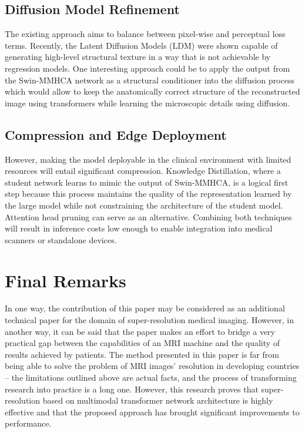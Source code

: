 \subsection{Diffusion Model Refinement}
The existing approach aims to balance between pixel-wise and perceptual loss terms. Recently, the Latent Diffusion Models (LDM) were shown capable of generating high-level structural texture in a way that is not achievable by regression models. One interesting approach could be to apply the output from the Swin-MMHCA network as a structural conditioner into the diffusion process which would allow to keep the anatomically correct structure of the reconstructed image using transformers while learning the microscopic details using diffusion.

\subsection{Compression and Edge Deployment}
However, making the model deployable in the clinical environment with limited resources will entail significant compression. Knowledge Distillation, where a student network learns to mimic the output of Swin-MMHCA, is a logical first step because this process maintains the quality of the representation learned by the large model while not constraining the architecture of the student model. Attention head pruning can serve as an alternative. Combining both techniques will result in inference costs low enough to enable integration into medical scanners or standalone devices.

\section{Final Remarks}
In one way, the contribution of this paper may be considered as an additional technical paper for the domain of super-resolution medical imaging. However, in another way, it can be said that the paper makes an effort to bridge a very practical gap between the capabilities of an MRI machine and the quality of results achieved by patients. The method presented in this paper is far from being able to solve the problem of MRI images' resolution in developing countries – the limitations outlined above are actual facts, and the process of transforming research into practice is a long one. However, this research proves that super-resolution based on multimodal transformer network architecture is highly effective and that the proposed approach has brought significant improvements to performance.